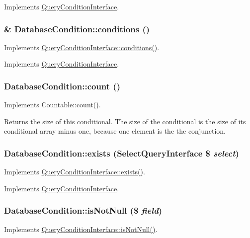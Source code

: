 Implements \hyperlink{interfaceQueryConditionInterface_aa6d9d96fa17441b5222d1ffddd4c1799}{QueryConditionInterface}.\hypertarget{classDatabaseCondition_a9a399f85011d31611a0a01f9d2b30f10}{
\subsubsection[{conditions}]{\setlength{\rightskip}{0pt plus 5cm}\& DatabaseCondition::conditions ()}}
\label{classDatabaseCondition_a9a399f85011d31611a0a01f9d2b30f10}
Implements \hyperlink{interfaceQueryConditionInterface_a894cc290ed61feb3693b1d459ae86888}{QueryConditionInterface::conditions()}. 

Implements \hyperlink{interfaceQueryConditionInterface_a894cc290ed61feb3693b1d459ae86888}{QueryConditionInterface}.\hypertarget{classDatabaseCondition_a5eafb9a93459b1f1da6e93c1104c3a1c}{
\subsubsection[{count}]{\setlength{\rightskip}{0pt plus 5cm}DatabaseCondition::count ()}}
\label{classDatabaseCondition_a5eafb9a93459b1f1da6e93c1104c3a1c}
Implements Countable::count().

Returns the size of this conditional. The size of the conditional is the size of its conditional array minus one, because one element is the the conjunction. \hypertarget{classDatabaseCondition_ab3f1025c61cd359b097f3c1e949d4b05}{
\subsubsection[{exists}]{\setlength{\rightskip}{0pt plus 5cm}DatabaseCondition::exists ({\bf SelectQueryInterface} \$ {\em select})}}
\label{classDatabaseCondition_ab3f1025c61cd359b097f3c1e949d4b05}
Implements \hyperlink{interfaceQueryConditionInterface_a27a52b6e84393275ad2c54eaf1bd764a}{QueryConditionInterface::exists()}. 

Implements \hyperlink{interfaceQueryConditionInterface_a27a52b6e84393275ad2c54eaf1bd764a}{QueryConditionInterface}.\hypertarget{classDatabaseCondition_aa7499e52cbf791273890fe3e1c47177b}{
\subsubsection[{isNotNull}]{\setlength{\rightskip}{0pt plus 5cm}DatabaseCondition::isNotNull (\$ {\em field})}}
\label{classDatabaseCondition_aa7499e52cbf791273890fe3e1c47177b}
Implements \hyperlink{interfaceQueryConditionInterface_a8bbb6acc9c72911b165cf6eb1dc31453}{QueryConditionInterface::isNotNull()}. 

